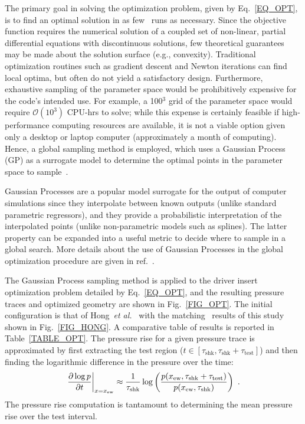 The primary goal in solving the optimization problem, given by Eq.~\ref{EQ_OPT}, is to find an optimal solution in as few \stnshk\ runs as necessary. Since the objective function requires the numerical solution of a coupled set of non-linear, partial differential equations with discontinuous solutions, few theoretical guarantees may be made about the solution surface (e.g., convexity). Traditional optimization routines such as gradient descent and Newton iterations can find local optima, but often do not yield a satisfactory design. Furthermore, exhaustive sampling of the parameter space would be prohibitively expensive for the code's intended use. For example, a 100$^3$ grid of the parameter space would require $\mathcal{O}(10^3)$ CPU-hrs to solve; while this expense is certainly feasible if high-performance computing resources are available, it is not a viable option given only a desktop or laptop computer (approximately a month of computing). Hence, a global sampling method is employed, which uses a Gaussian Process (GP) as a surrogate model to determine the optimal points in the parameter space to sample~\cite{SANTER_BOOK,RASMUSSEN_BOOK}. 

Gaussian Processes are a popular model surrogate for the output of computer simulations since they interpolate between known outputs (unlike standard parametric regressors), and they provide a probabilistic interpretation of the interpolated points (unlike non-parametric models such as splines). The latter property can be expanded into a useful metric to decide where to sample in a global search. More details about the use of Gaussian Processes in the global optimization procedure are given in ref.~\cite{GROGAN_THESIS18}.

The Gaussian Process sampling method is applied to the driver insert optimization problem detailed by Eq.~\ref{EQ_OPT}, and the resulting pressure traces and optimized geometry are shown in Fig.~\ref{FIG_OPT}. The initial configuration is that of Hong~\emph{et al.}~\cite{HONG_PANG_VASU_DAVIDSON_HANSON_SW2009} with the matching \stnshk\ results of this study shown in Fig.~\ref{FIG_HONG}. A comparative table of results is reported in Table~\ref{TABLE_OPT}. The pressure rise for a given pressure trace is approximated by first extracting the test region ($t\in[\tau_\mathrm{shk},\tau_\mathrm{shk}+\tau_\mathrm{test}]$) and then finding the logarithmic difference in the pressure over the time:
\begin{equation}\label{EQ_PR}
\left . \frac{\p \log p}{\p t}\right |_{x=x_\mathrm{ew}}\approx\frac{1}{\tau_\mathrm{shk}}\log\left (\frac{ p(x_\mathrm{ew},\tau_\mathrm{shk}+\tau_\mathrm{test})}{p(x_\mathrm{ew},\tau_\mathrm{shk})}\right)\ .
\end{equation}
The pressure rise computation is tantamount to determining the mean pressure rise over the test interval. 

